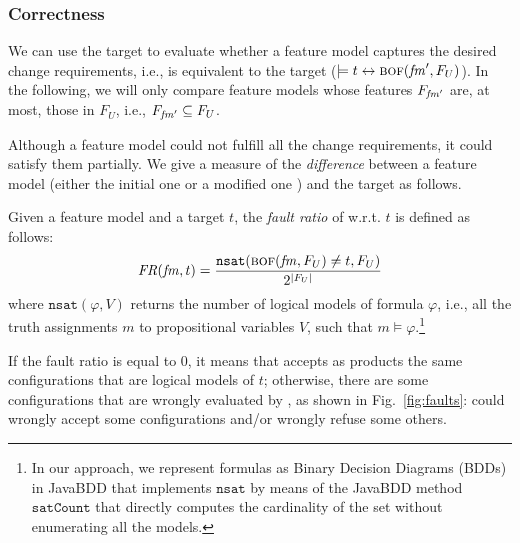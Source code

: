 \begin{tikzborder}{\cite{Gargantini16:validation}}
\begin{tikzborder}{\cite{gargantini_combinatorial_2017}}
\begin{tikzborder}{\cite{garn2019}}
\begin{tikzborder}{\cite{arcaini2019achieving}}
	\subsubsection{Correctness}\label{sec:correctness}
	
	We can use the target to evaluate whether a feature model \fmp captures the desired change requirements, i.e., \fmp is equivalent to the target ($\models t \leftrightarrow \textsc{bof}(\mathit{fm}^\prime, F_U)$). In the following, we will only compare feature models \fmp whose features $F_{\mathit{fm}^\prime}$ are, at most, those in $F_U$, i.e., $F_{\mathit{fm}^\prime} \subseteq F_U$.
	
	Although a feature model could not fulfill all the change requirements, it could satisfy them partially. We give a measure of the \emph{difference} between a feature model \fm (either the initial one \initFm or a modified one \fmp) and the target as follows.
	
	\begin{mydef}\label{def:faultratio}
		Given a feature model \fm and a target $t$, the \emph{fault ratio} of \fm w.r.t. $t$ is defined as follows:
		\begin{equation*}
		\mathit{FR}(\mathit{fm}, t) = \frac{\mathtt{nsat}(\textsc{bof}(\mathit{fm}, F_U) \neq t, F_U)}{2^{|F_U|}}
		\end{equation*}
		where $\mathtt{nsat}(\varphi, V)$ returns the number of logical models of formula $\varphi$, i.e., all the truth assignments $m$ to propositional variables $V$, such that $m \models \varphi$.\footnote{In our approach, we represent formulas as Binary Decision Diagrams (BDDs) in JavaBDD that implements $\mathtt{nsat}$ by means of the JavaBDD method $\mathtt{satCount}$ that directly computes the cardinality of the set without enumerating all the models.}
	\end{mydef}
	
	If the fault ratio is equal to 0, it means that \fm accepts as products the same configurations that are logical models of $t$; otherwise, there are some configurations that are wrongly evaluated by \fm, as shown in Fig.~\ref{fig:faults}: \fm could wrongly accept some configurations and/or wrongly refuse some others.
	

\end{tikzborder}
\end{tikzborder}
\end{tikzborder}
\end{tikzborder}
